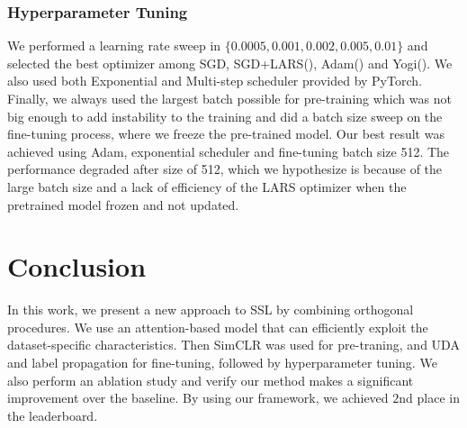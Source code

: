 \documentclass[10pt,twocolumn,letterpaper]{article}
\begin{document}
	
	\subsubsection{Hyperparameter Tuning}
	We performed a learning rate sweep in $\{0.0005, 0.001, 0.002, 0.005, 0.01\}$ and selected the best optimizer among SGD, SGD+LARS(\cite{LARS, torchLARS}), Adam(\cite{Adam}) and Yogi(\cite{Yogi}). We also used both Exponential and Multi-step scheduler provided by PyTorch. Finally, we always used the largest batch possible for pre-training which was not big enough to add instability to the training and did a batch size sweep on the fine-tuning process, where we freeze the pre-trained model. Our best result was achieved using Adam, exponential scheduler and fine-tuning batch size 512. The performance degraded after size of 512, which we hypothesize is because of the large batch size and a lack of efficiency of the LARS optimizer when the pretrained model frozen and not updated.
	
	
	\section{Conclusion}
	In this work, we present a new approach to SSL by combining orthogonal procedures.
	We use an attention-based model that can efficiently exploit the dataset-specific characteristics. Then SimCLR was used for pre-traning, and UDA and label propagation for fine-tuning, followed by hyperparameter tuning. We also perform an ablation study and verify our method makes a significant improvement over the baseline. By using our framework, we achieved $2$nd place in the leaderboard.
	
	{\small
		
		
	}
	
\end{document}
